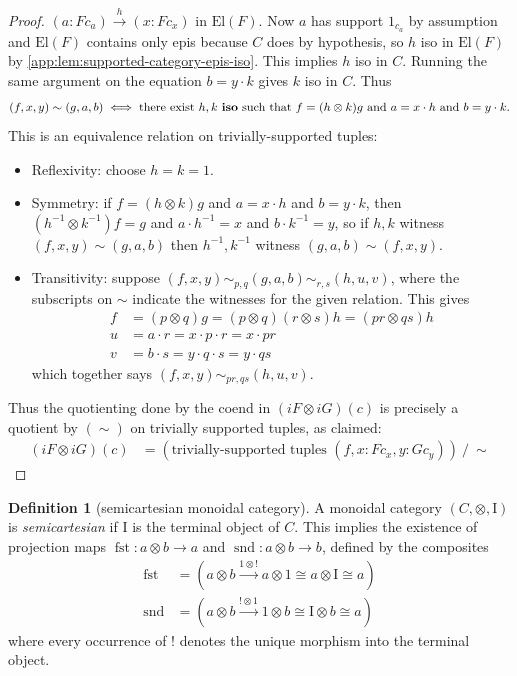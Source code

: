 \documentclass[
  sigconf,
  screen, ]{acmart}
\theoremstyle{definition}
\newtheorem{definition}[theorem]{Definition}
\newcommand\nref[2]{\hyperref[#1]{#2}} \newcommand\checkhigh{{\huge{\color{red}\textbf{TODO: check}}}}
\newcommand\catelts{{\nref{def:catelts}{\mathrm{El}}}}
\newcommand\monunit{\mathrm{I}}
\newcommand\scmfst{\mathop{\nref{app:def:semicartesian-monoidal-category}{\mathrm{fst}}}}
\newcommand\scmsnd{\mathop{\nref{app:def:semicartesian-monoidal-category}{\mathrm{snd}}}}
\begin{document}
\begin{proof}
  $(a : F c_a)\stackrel h\longrightarrow (x : F c_x)$
  in $\catelts(F)$.
  Now $a$ has support $1_{ c_a}$
  by assumption and $\catelts(F)$ contains only epis
  because $ C$ does by hypothesis,
  so $h$ iso in $\catelts(F)$
  by \cref{app:lem:supported-category-epis-iso}.
  This implies $h$ iso in $ C$.
  Running the same argument on the equation $b = y\cdot k$
  gives $k$ iso in $ C$.
  Thus
  \begin{align} \label{app:def:sheaf-tensor-product-eqv-rel}
    (f,x,y) \sim (g,a,b)
    \iff 
    \text{there exist $h,k$ \textbf{iso} such that $f = (h\otimes k) g$ and $a = x\cdot h$ and $b = y\cdot k$.}
  \end{align}
  This is an equivalence relation on trivially-supported tuples:
  \begin{itemize}
  \item Reflexivity: choose $h = k = 1$.
  \item Symmetry: if $f = (h\otimes k) g$ and $a = x\cdot h$ and $ b = y\cdot k$,
    then $(h^{-1}\otimes k^{-1}) f = g$ and $a\cdot  h^{-1} = x$ and $b\cdot k^{-1} = y$,
    so if $h,k$ witness $(f,x,y) \sim (g,a,b)$ then $h^{-1},k^{-1}$
    witness $(g,a,b)\sim(f,x,y)$.
  \item Transitivity:
    suppose $(f,x,y) \sim_{p,q} (g,a,b) \sim_{r,s} (h,u,v)$,
    where the subscripts on $\sim$ indicate the witnesses for the given relation.
    This gives
    \begin{align*}
      f &= (p\otimes q)  g = (p\otimes q)  (r\otimes s)  h = (pr\otimes qs)h\\
      u &= a\cdot r = x\cdot p \cdot r = x\cdot pr \\
      v &= b\cdot s = y\cdot q \cdot s = y\cdot qs
    \end{align*}
    which together says $(f,x,y) \sim_{pr,qs} (h,u,v)$.
  \end{itemize}
  Thus the quotienting done by the coend in $(iF\otimes iG)( c)$
  is precisely a quotient by $(\sim)$ on trivially supported tuples,
  as claimed:
  \begin{align*}
    (iF\otimes iG)( c) &= 
      \left(\text{trivially-supported tuples $(f, x : F c_x, y : G c_y)$}\right)
      ~/~\!\sim
  \end{align*}
\end{proof}

\begin{definition}[semicartesian monoidal category] \label{app:def:semicartesian-monoidal-category}
  A monoidal category $(C, \otimes, \monunit)$
  is \emph{semicartesian} if $\monunit$ is the terminal object of $C$.
  This implies the existence of projection maps
  $\scmfst  : a\otimes b\to a$
  and $\scmsnd  : a\otimes b\to b$,
  defined by the composites
  \begin{align*}
    \scmfst  &= \left(a\otimes b \xrightarrow{1\otimes !} a\otimes 1 \cong a \otimes \monunit \cong a\right) \\
    \scmsnd  &= \left(a\otimes b \xrightarrow{!\otimes 1} 1\otimes b \cong \monunit \otimes b \cong a\right)
  \end{align*}
  where every occurrence of $!$ denotes the unique morphism into the terminal object.
\end{definition}
\end{document}

